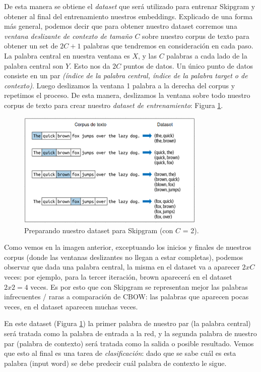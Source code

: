 \documentclass[12pt,a4paper]{article}
\begin{document}
\begin{sloppypar}
De esta manera se obtiene el \textit{dataset} que será utilizado para entrenar Skipgram y obtener al final del entrenamiento nuestros embeddings. Explicado de una forma más general, podemos decir que para obtener nuestro dataset corremos una \textit{ventana deslizante de contexto de tamaño $C$} sobre nuestro corpus de texto para obtener un set de $2C+1$ palabras que tendremos en consideración en cada paso. La palabra central en nuestra ventana es $X$, y las $C$ palabras a cada lado de la palabra central son $Y$. Esto nos da $2C$ puntos de datos. Un único punto de datos consiste en un par \textit{(índice de la palabra central, índice de la palabra target o de contexto)}. Luego deslizamos la ventana 1 palabra a la derecha del corpus y repetimos el proceso. De esta manera, deslizamos la ventana sobre todo nuestro corpus de texto para crear nuestro \textit{dataset de entrenamiento}: Figura \ref{fig:Imagen_NLP_21}. 

\begin{figure}[H]    
 \centering
 \includegraphics[width=0.8\textwidth]{images/NLP/21.png}
 \captionsetup{justification=centering,margin=4cm}
 \caption{Preparando nuestro dataset para Skipgram (con $C$ = 2)\cite{NLP_26}.}
 \label{fig:Imagen_NLP_21}
\end{figure}

Como vemos en la imagen anterior, exceptuando los inicios y finales de nuestros corpus (donde las ventanas deslizantes no llegan a estar completas), podemos observar que dada una palabra central, la misma en el dataset va a aparecer $2xC$ veces: por ejemplo, para la tercer iteración, brown aparecerá en el dataset $2x2=4$ veces. Es por esto que con Skipgram se representan mejor las palabras infrecuentes / raras a comparación de CBOW: las palabras que aparecen pocas veces, en el dataset aparecen muchas veces.

En este dataset (Figura \ref{fig:Imagen_NLP_21}) la primer palabra de nuestro par (la palabra central) será tratada como la palabra de entrada a la red, y la segunda palabra de nuestro par (palabra de contexto) será tratada como la salida o posible resultado. Vemos que esto al final es una tarea de \textit{clasificación}: dado que se sabe cuál es esta palabra (input word) se debe predecir cuál palabra de contexto le sigue.


\end{sloppypar}
\end{document}
